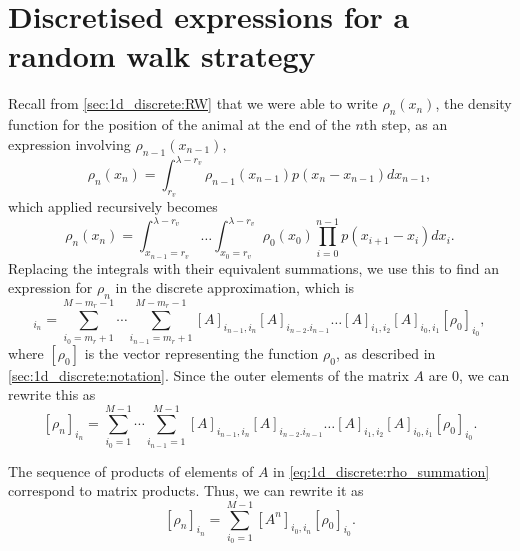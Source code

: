 \section{Discretised expressions for a random walk strategy \label{sec:1d_discrete:RW}}

Recall from \cref{sec:1d_discrete:RW} that we were able to write $\rho_n(x_n)$, the density function for the position of the animal at the end of the $n$th step, as an expression involving $\rho_{n-1}(x_{n-1})$, 
\begin{equation*}
\rho_n(x_n) = \int_{r_v}^{\lambda-r_v} \rho_{n-1}(x_{n-1}) p(x_n-x_{n-1}) dx_{n-1},
\end{equation*}
which applied recursively becomes
\begin{equation*}
\rho_n(x_n) = \int_{x_{n-1}=r_v}^{\lambda-r_v} \dots \int_{x_0 = r_v}^{\lambda-r_v} \rho_{0}(x_0) \prod_{i=0}^{n-1} p(x_{i+1}-x_{i}) dx_{i}.
\end{equation*}
Replacing the integrals with their equivalent summations, we use this to find an expression for $\rho_n$ in the discrete approximation, which is
\begin{equation*}
[\rho_n]_{i_n} = \sum_{i_0=m_r+1}^{M-m_r-1} \cdots \sum_{i_{n-1}=m_r+1}^{M-m_r-1} [A]_{i_{n-1},i_{n}} [A]_{i_{n-2}.i_{n-1}} \dots [A]_{i_1,i_2}[A]_{i_0,i_1} [\rho_0]_{i_0},
\end{equation*}
where $[\rho_0]$ is the vector representing the function $\rho_0$, as described in \cref{sec:1d_discrete:notation}. 
Since the outer elements of the matrix $A$ are $0$, we can rewrite this as
\begin{equation}
\label{eq:1d_discrete:rho_summation}
[\rho_n]_{i_n} = \sum_{i_0=1}^{M-1} \cdots \sum_{i_{n-1}=1}^{M-1} [A]_{i_{n-1},i_{n}} [A]_{i_{n-2}.i_{n-1}} \dots [A]_{i_1,i_2}[A]_{i_0,i_1} [\rho_0]_{i_0}.
\end{equation}

The sequence of products of elements of $A$ in \cref{eq:1d_discrete:rho_summation} correspond to matrix products. Thus, we can rewrite it as
\begin{equation}
\label{eq:1d_discrete:rho_matrix}
[\rho_n]_{i_n} = \sum_{i_0=1}^{M-1} [A^n]_{i_0,i_n}[\rho_0]_{i_0}.
\end{equation}


